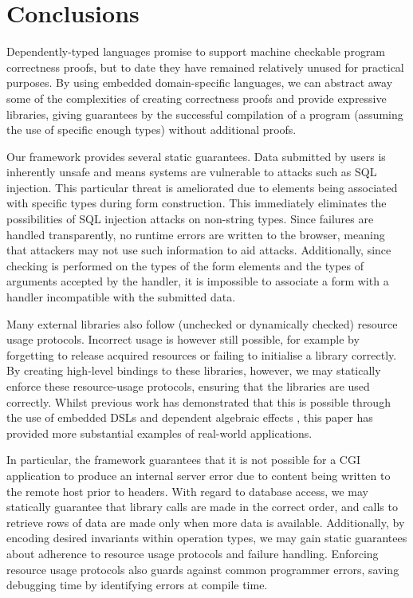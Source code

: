 
\section{Conclusions}

Dependently-typed languages promise to support machine checkable program
correctness proofs, but to date they have remained relatively unused for
practical purposes. By using embedded domain-specific languages, we can
abstract away some of the complexities of creating correctness proofs and
provide expressive libraries, giving guarantees by the successful compilation
of a program (assuming the use of specific enough types) without additional
proofs.

Our framework provides several static
guarantees. Data submitted by users is inherently unsafe and
means systems are vulnerable to attacks
such as SQL injection. This particular threat is ameliorated due
to elements being associated with specific types during form construction. This
immediately eliminates the possibilities of SQL injection attacks on non-string
types. Since failures are handled transparently, no runtime errors are written
to the browser, meaning that attackers may not use such information to aid
attacks. Additionally, since checking is performed on the types of the form
elements and the types of arguments accepted by the handler, it is impossible
to associate a form with a handler incompatible with the submitted data.

Many external libraries also follow (unchecked or dynamically checked) 
resource usage protocols.
Incorrect usage is however still possible, for
example by forgetting to release acquired resources or failing to
initialise a library correctly. By creating high-level bindings to these
libraries, however, we may statically enforce these resource-usage protocols,
ensuring that the libraries are used correctly. Whilst previous work has
demonstrated that this is possible through the use of embedded DSLs
\cite{brady:edsl} and dependent algebraic effects \cite{brady:effects},
this paper has provided more substantial examples of real-world applications. 

In particular, the framework guarantees that it is not possible for a CGI 
application to
produce an internal server error due to content being written to the remote
host prior to headers. With regard to database access, we may statically
guarantee that library calls are made in the correct order, and calls to
retrieve rows of data are made only when more data is available. Additionally, by encoding desired invariants within operation types, we may gain static guarantees about adherence to resource usage protocols and failure handling.
Enforcing resource usage protocols also guards against common programmer
errors, saving debugging time by identifying errors at compile time.

